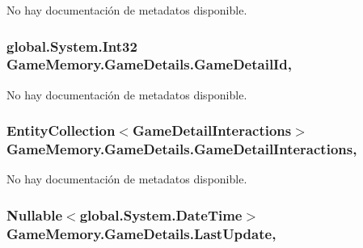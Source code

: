 No hay documentación de metadatos disponible. 

\hypertarget{class_game_memory_1_1_game_details_a18b899c092c351ffb5c98850b8d82103}{
\subsubsection[{Game\-Detail\-Id}]{\setlength{\rightskip}{0pt plus 5cm}global.\-System.\-Int32 Game\-Memory.\-Game\-Details.\-Game\-Detail\-Id\hspace{0.3cm}{\ttfamily [get]}, {\ttfamily [set]}}}\label{class_game_memory_1_1_game_details_a18b899c092c351ffb5c98850b8d82103}


No hay documentación de metadatos disponible. 

\hypertarget{class_game_memory_1_1_game_details_a1faf6b10db4f67fd9bb05ea9a20cf17e}{
\subsubsection[{Game\-Detail\-Interactions}]{\setlength{\rightskip}{0pt plus 5cm}Entity\-Collection$<${\bf Game\-Detail\-Interactions}$>$ Game\-Memory.\-Game\-Details.\-Game\-Detail\-Interactions\hspace{0.3cm}{\ttfamily [get]}, {\ttfamily [set]}}}\label{class_game_memory_1_1_game_details_a1faf6b10db4f67fd9bb05ea9a20cf17e}


No hay documentación de metadatos disponible. 

\hypertarget{class_game_memory_1_1_game_details_a98363629697ab7b4d13bc4fa5ac7c42b}{
\subsubsection[{Last\-Update}]{\setlength{\rightskip}{0pt plus 5cm}Nullable$<$global.\-System.\-Date\-Time$>$ Game\-Memory.\-Game\-Details.\-Last\-Update\hspace{0.3cm}{\ttfamily [get]}, {\ttfamily [set]}}}\label{class_game_memory_1_1_game_details_a98363629697ab7b4d13bc4fa5ac7c42b}


